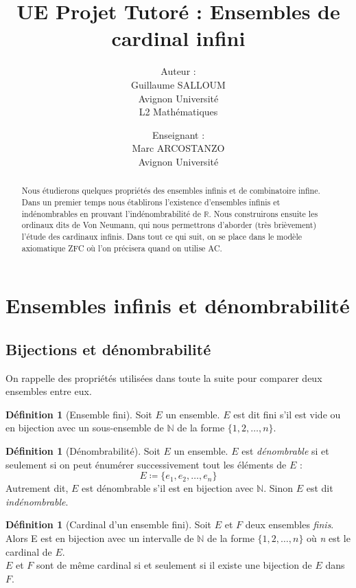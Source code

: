 \documentclass{article}
\title{UE Projet Tutoré : Ensembles de cardinal infini}
\author{Auteur :\\
	Guillaume SALLOUM \\ 
	Avignon Université \\ 
	L2 Mathématiques
	\and
	Enseignant : \\
	Marc ARCOSTANZO \\
	Avignon Université}
\date{}
\theoremstyle{definition}
\newtheorem{definition}[subsubsection]{Définition}
\theoremstyle{plain}
\theoremstyle{plain}
\theoremstyle{plain}
\theoremstyle{plain}
\theoremstyle{plain}
\begin{document}
\maketitle
\begin{abstract}
	Nous étudierons quelques propriétés des ensembles infinis et de combinatoire infine.
	Dans un premier temps nous établirons l'existence d'ensembles infinis et indénombrables en prouvant l'indénombrabilité de \( \mathbb{R} \). 
	Nous construirons ensuite les ordinaux dits de Von Neumann, qui nous permettrons d'aborder (très brièvement) l'étude des cardinaux infinis.
	Dans tout ce qui suit, on se place dans le modèle axiomatique ZFC où l'on précisera quand on utilise AC. 
\end{abstract}

\tableofcontents
\clearpage
\section{Ensembles infinis et dénombrabilité}
\subsection{Bijections et dénombrabilité}

On rappelle des propriétés utilisées dans toute la suite pour comparer deux ensembles entre eux.

\begin{definition}[Ensemble fini]
	Soit \( E \) un ensemble.
	\( E \) est dit fini s'il est vide ou en bijection avec un sous-ensemble de \( \mathbb{N} \) de la forme \( \{1, 2, \ldots, n\} \).
\end{definition}

\begin{definition}[Dénombrabilité]
	Soit \( E \) un ensemble. \( E \) est \textit{dénombrable} si et seulement si on peut énumérer successivement tout les éléments de \( E \) :
\begin{equation*}
	E \coloneqq \{e_{1}, e_{2}, \ldots, e_{n}\} 
\end{equation*} 
	Autrement dit, \( E \) est dénombrable s'il est en bijection avec \( \mathbb{N} \). Sinon \( E \) est dit \textit{indénombrable}.
\end{definition}
\begin{definition}[Cardinal d'un ensemble fini]
	Soit \( E \) et \( F \) deux ensembles \textit{finis}.
	Alors E est en bijection avec un intervalle de \( \mathbb{N} \) de la forme \( \{1, 2, \ldots, n\} \) où \textit{n} est le cardinal de \( E \). \\
	\( E \) et \( F \) sont de même cardinal si et seulement si il existe une bijection de \( E \) dans \( F \).
\
\end{definition}
\end{document}
